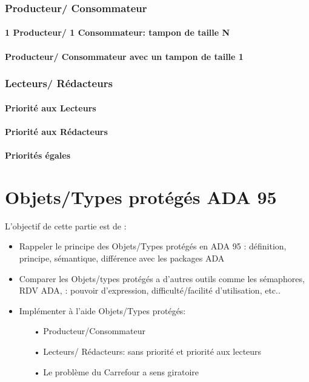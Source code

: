 \documentclass[11pt,a4paper]{article}
\begin{document}
\section{Producteur/ Consommateur}
\subsection{1 Producteur/ 1 Consommateur: tampon de taille N}
\subsection{Producteur/ Consommateur avec un tampon de taille 1}
\section{Lecteurs/ Rédacteurs}
\subsection{Priorité aux Lecteurs}
\subsection{Priorité aux Rédacteurs}
\subsection{Priorités égales}
\newpage
\part{Objets/Types protégés ADA 95}
L'objectif de cette partie est de :
\begin{itemize}
\item Rappeler le principe des Objets/Types protégés en ADA 95 : définition, principe, sémantique, différence avec les packages ADA
\item Comparer les  Objets/types protégés a d'autres outils comme  les sémaphores, RDV ADA, : pouvoir d'expression, difficulté/facilité d'utilisation, etc..
\item  Implémenter à l'aide Objets/Types protégés:
\begin{itemize}
\item[•] Producteur/Consommateur
\item[•] Lecteurs/ Rédacteurs: sans priorité et  priorité aux lecteurs
\item[•] Le problème du Carrefour a sens giratoire  
\end{itemize}
\end{itemize}
\end{document}
